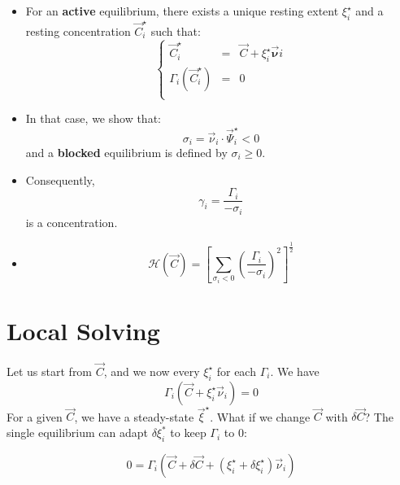 \documentclass[aps,12pt]{revtex4}
\begin{document}
\begin{itemize}
\item For an {\bf active} equilibrium, there exists a unique resting extent $\xi_i^\star$ and a resting concentration $\vec{C}_i^\star$ such that:
\begin{equation}
\left\lbrace
\begin{array}{rcl}
	\vec{C}_i^\star & = & \vec{C} + \xi_i^\star \vec{\bm{\nu}}i\\
	\Gamma_i(\vec{C}_i^\star) & = & 0 \\
\end{array}
\right.
\end{equation}

\item In that case, we show that:
\begin{equation}
	\sigma_i = \vec{\nu}_i \cdot \vec{\Psi}_i^\star < 0
\end{equation}	
and a {\bf blocked} equilibrium is defined by $\sigma_i\geq 0$.

\item Consequently,
\begin{equation}
	\gamma_i = \dfrac{\Gamma_i}{-\sigma_i} 
\end{equation}
is a concentration.

\item \begin{equation}
\mathcal{H}(\vec{C}) = \left\lbrack\sum_{\sigma_i<0} \left(\dfrac{\Gamma_i}{-\sigma_i}\right)^2 \right\rbrack^{\frac{1}{2}}
\end{equation}

 
\end{itemize}
 
 
 
\section{Local Solving}

Let us start from $\vec{C}$, and we now every $\xi_i^\star$ for each $\Gamma_i$.
We have
\begin{equation}
	\Gamma_i\left(\vec{C} + \xi_i^\star \vec{\nu}_i\right) =  0
\end{equation}
For a given $\vec{C}$, we have a steady-state $\vec{\xi}^\star$.
What if we change $\vec{C}$ with $\delta\vec{C}$?
The single equilibrium can adapt $\delta\xi_i^*$ to keep $\Gamma_i$ to $0$:

\begin{equation}
0 = \Gamma_i\left( \vec{C} + \delta\vec{C} + (\xi_i^\star+\delta\xi_i^\star) \vec{\nu}_i \right)
\end{equation}
\end{document}
